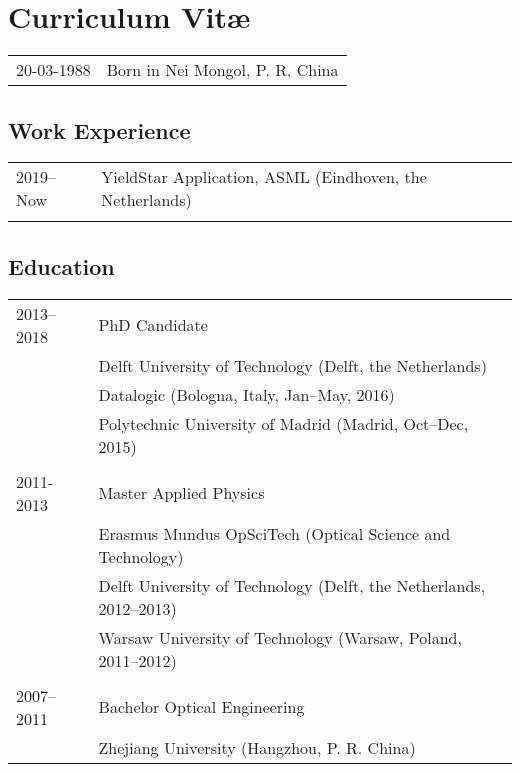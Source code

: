 \chapter*{Curriculum Vit\ae}

\makeatletter
\authors{\@firstname\ {\titleshape\@lastname}}
\makeatother

\noindent
\begin{tabular}{p{}l}
    20-03-1988 & Born in Nei Mongol, P. R. China 
\end{tabular}

\section*{Work Experience}
\begin{tabular}{p{}l}
    2019--Now & YieldStar Application, ASML (Eindhoven, the Netherlands) \\

    \\
\end{tabular}

\section*{Education}
\begin{tabular}{p{}l}

    2013--2018 & PhD Candidate \\
    & Delft University of Technology (Delft, the Netherlands)\\
    & Datalogic (Bologna, Italy, Jan--May, 2016)\\
    & Polytechnic University of Madrid (Madrid, Oct--Dec, 2015)\\
    \\
    2011-2013 & Master Applied Physics \\
    & Erasmus Mundus OpSciTech (Optical Science and Technology)\\
    &Delft University of Technology (Delft, the Netherlands, 2012--2013)\\
    &Warsaw University of Technology (Warsaw, Poland, 2011--2012)\\
    \\
    2007--2011 & Bachelor Optical Engineering\\
    & Zhejiang University (Hangzhou, P. R. China)
    
\end{tabular}
    
